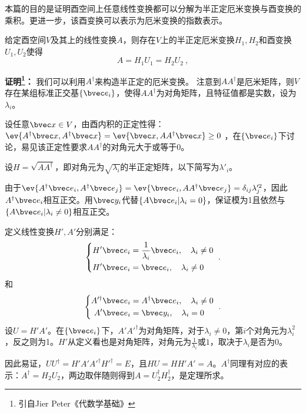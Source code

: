 本篇的目的是证明酉空间上任意线性变换都可以分解为半正定厄米变换与酉变换的乘积。更进一步，该酉变换可以表示为厄米变换的指数表示。
\begin{theorem}{}\label{the_PoDe_2}
给定酉空间$V$及其上的线性变换$A$，则存在$V$上的半正定厄米变换$H_1,H_2$和酉变换$U_1,U_2$使得
\begin{equation}
A=H_1U_1=H_2U_2~,
\end{equation}
\end{theorem}
\textbf{证明\footnote{引自Jier Peter《代数学基础》}：}
我们可以利用$A^{\dagger}$来构造半正定的厄米变换。
注意到$AA^{\dagger}$是厄米矩阵，则$V$存在某组标准正交基$\{\bvec e_i\}$，使得$AA^{\dagger}$为对角矩阵，且特征值都是实数，设为$\lambda_i$。

设任意$\bvec x\in V$，由酉内积的正定性得：$\ev{A^{\dagger}\bvec x,A^{\dagger}\bvec x}=\ev{\bvec x,AA^{\dagger}\bvec x}\ge 0$
，在$\{\bvec e_i\}$下讨论，易见该正定性要求$AA^{\dagger}$的对角元大于或等于0。

设$H=\sqrt{AA^{\dagger}}$，即对角元为$\sqrt{\lambda_i}$的半正定矩阵，以下简写为$\lambda'_i$。

由于$\ev{A^{\dagger}\bvec e_i,A^{\dagger}\bvec e_j}=\ev{\bvec e_i,AA^{\dagger}\bvec e_j}=\delta_{ij}\lambda'^2_j$，因此$A^{\dagger}\bvec e_i$相互正交。用$\bvec y_i$代替$\{A\bvec e_i|\lambda_i=0\}$，保证模为1且依然与$\{A\bvec e_i|\lambda_i\neq 0\}$相互正交。

定义线性变换$H',A'$分别满足：
\begin{equation}
\left\{
    \begin{aligned}
    H'\bvec e_i&=\frac{1}{\lambda_i}\bvec e_i,\quad\lambda_i\neq 0\\
    H'\bvec e_i&=\bvec e_i,\quad\lambda_i\neq 0
    \end{aligned}
    \right.~.
\end{equation}
和
\begin{equation}
\left\{
    \begin{aligned}
    A'^{\dagger}\bvec e_i&=A^{\dagger}\bvec e_i,\quad\lambda_i\neq 0\\
    A'\bvec e_i&=\bvec y_i,\quad\lambda_i= 0
    \end{aligned}
    \right.~.
\end{equation}
设$U=H'A'$。在$\{\bvec e_i\}$下，$A'A'^{\dagger}$为对角矩阵，对于$\lambda_i\neq 0$，第$i$个对角元为$\lambda_i^2$，反之则为1。$H'$从定义看也是对角矩阵，对角元为$\frac{1}{\lambda_i}$或$1$，取决于$\lambda_i$是否为0。

因此易证，$UU^{\dagger}=H'A'A'^{\dagger}H'^{\dagger}=E$，且$HU=HH'A'=A$。$A^{\dagger}$同理有对应的表示：$A^{\dagger}=H_2U_2$，两边取伴随则得到$A=U_2^{\dagger}H^{\dagger}_2$，是定理所求。


